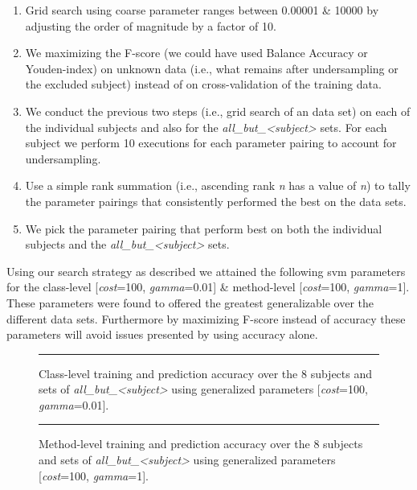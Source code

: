 \begin{enumerate}
  \item Grid search using coarse parameter ranges between 0.00001 \& 10000 by adjusting the order of magnitude by a factor of 10.
  \item We maximizing the F-score (we could have used Balance Accuracy or Youden-index) on unknown data (i.e., what remains after undersampling or the excluded subject) instead of on cross-validation of the training data.
  \item We conduct the previous two steps (i.e., grid search of an data set) on each of the individual subjects and also for the \emph{all\_but\_<subject>} sets. For each subject we perform 10 executions for each parameter pairing to account for  undersampling.
  \item Use a simple rank summation (i.e., ascending rank \emph{n} has a value of \emph{n}) to tally the parameter pairings that consistently performed the best on the data sets.
  \item We pick the parameter pairing that perform best on both the individual subjects and the \emph{all\_but\_<subject>} sets.
\end{enumerate}

Using our search strategy as described we attained the following \gls{svm} parameters for the class-level [\emph{cost}=100, \emph{gamma}=0.01] \& method-level [\emph{cost}=100, \emph{gamma}=1]. These parameters were found to offered the greatest generalizable over the different data sets. Furthermore by maximizing F-score instead of accuracy these parameters will avoid issues presented by using accuracy alone.

\begin{figure}[!ht]
  \centering
  \begin{adjustbox}{max size={.95\textwidth}{.95\textheight}}
    
  \end{adjustbox}
  \caption{Class-level training and prediction accuracy over the 8 subjects and sets of \emph{all\_but\_<subject>} using generalized parameters [\emph{cost}=100, \emph{gamma}=0.01].}
  \vspace{2mm}
  \hrule
  \label{fig:prediction_with_parameters_class_graph}
\end{figure}

\begin{figure}[!ht]
  \centering
  \begin{adjustbox}{max size={.95\textwidth}{.95\textheight}}
    
  \end{adjustbox}
  \caption{Method-level training and prediction accuracy over the 8 subjects and sets of \emph{all\_but\_<subject>} using generalized parameters [\emph{cost}=100, \emph{gamma}=1].}
  \vspace{2mm}
  \hrule
  \label{fig:prediction_with_parameters_method_graph}
\end{figure}

